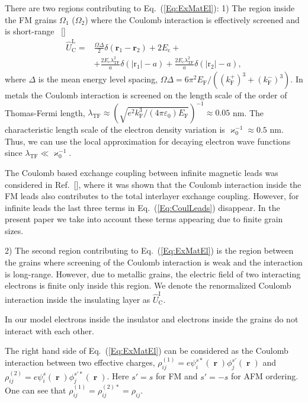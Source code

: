 \documentclass[aps,prb,amsmath,amssymb,twocolumn,superscriptaddress,showpacs,floatfix]{revtex4-1}
\DeclareMathOperator{\rv}{\mathbf r}
\begin{document}
There are two regions contributing to Eq.~(\ref{Eq:ExMatEl}): 1) The region inside the
FM grains $\Omega_{1}$ ($\Omega_2$) where the Coulomb interaction is effectively
screened and is short-range ~[]
\begin{equation}\label{Eq:CoulLeads}
\begin{split}
\hat U^\mathrm L_\mathrm C=&\frac{\Omega\Delta}{2}\delta(\mathbf r_1-\mathbf r_2)+2E_\mathrm c+\\&+\frac{2E_\mathrm c\lambda_\mathrm{TF}^2}{a}\delta(|\mathrm r_1|-a)+\frac{2E_\mathrm c\lambda_\mathrm{TF}^2}{a}\delta(|\mathrm r_2|-a),
\end{split}
\end{equation}
where $\Delta$ is the mean energy level spacing, $\Omega\Delta=6\pi^2E_\mathrm F/((k_\mathrm F^+)^3+(k_\mathrm F^-)^3)$.
In metals the Coulomb interaction is screened on the length scale of the order of
Thomas-Fermi length, $\lambda_\mathrm{TF}\approx(\sqrt{e^2k_\mathrm F^3/(4\pi\varepsilon_0)E_\mathrm F})^{-1} \approx 0.05$ nm.
The characteristic length scale of the electron density variation is
$\varkappa_0^{-1}\approx0.5$ nm. Thus,
we can use the local approximation for decaying electron
wave functions since $\lambda_\mathrm{TF}\ll\varkappa_0^{-1}$.

The Coulomb based exchange coupling between infinite magnetic
leads was considered in Ref.~[], where it was shown that
the Coulomb interaction inside the FM leads also contributes to the total
interlayer exchange coupling. However, for infinite leads the last three terms
in Eq.~(\ref{Eq:CoulLeads}) disappear. In the present paper we take
into account these terms appearing due to finite grain sizes.

2) The second region contributing to Eq.~(\ref{Eq:ExMatEl}) is the region
between the grains where screening of the Coulomb interaction is
weak and the interaction is long-range.
However, due to metallic grains, the electric field of two interacting
electrons is finite only inside this region. We denote the renormalized Coulomb
interaction inside the insulating layer as $\hat U^\mathrm I_\mathrm C$.

In our model electrons inside the insulator and electrons inside the grains do not interact with each other.

The right hand side of Eq.~(\ref{Eq:ExMatEl}) can be considered as the Coulomb interaction between two effective charges, $\rho_{ij}^{(1)}=e\psi^{s*}_i(\rv)\phi^{s'}_j(\rv)$ and $\rho_{ij}^{(2)}=e\psi^s_i(\rv)\phi^{s'*}_j(\rv)$. Here $s'=s$ for FM
and $s'=-s$ for AFM ordering. One can see that $\rho_{ij}^{(1)}=\rho_{ij}^{(2)*}=\rho_{ij}$.
\end{document}
